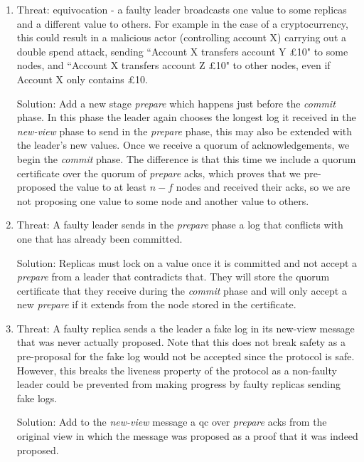 \begin{enumerate}
\item Threat: equivocation - a faulty leader broadcasts one value to some replicas and a different value to others. For example in the case of a cryptocurrency, this could result in a malicious actor (controlling account X) carrying out a double spend attack, sending ``Account X transfers account Y £10" to some nodes, and ``Account X transfers account Z £10" to other nodes, even if Account X only contains £10.

Solution: Add a new stage \textit{prepare} which happens just before the \textit{commit} phase. In this phase the leader again chooses the longest log it received in the \textit{new-view} phase to send in the \textit{prepare} phase, this may also be extended with the leader's new values. Once we receive a quorum of acknowledgements, we begin the \textit{commit} phase. The difference is that this time we include a quorum certificate over the quorum of \textit{prepare} acks, which proves that we pre-proposed the value to at least $n - f$ nodes and received their acks, so we are not proposing one value to some node and another value to others.

\item Threat: A faulty leader sends in the \textit{prepare} phase a log that conflicts with one that has already been committed.

Solution: Replicas must lock on a value once it is committed and not accept a \textit{prepare} from a leader that contradicts that. They will store the quorum certificate that they receive during the \textit{commit} phase and will only accept a new \textit{prepare} if it extends from the node stored in the certificate.

\item Threat: A faulty replica sends a the leader a fake log in its new-view message that was never actually proposed. Note that this does not break safety as a pre-proposal for the fake log would not be accepted since the protocol is safe. However, this breaks the liveness property of the protocol as a non-faulty leader could be prevented from making progress by faulty replicas sending fake logs.

Solution: Add to the \textit{new-view} message a qc over \textit{prepare} acks from the original view in which the message was proposed as a proof that it was indeed proposed.
\end{enumerate}
